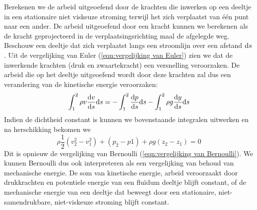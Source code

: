 Berekenen we de arbeid uitgeoefend door de krachten die inwerken op een deeltje in een stationaire niet viskeuze stroming terwijl het zich verplaatst van één punt naar een ander. De arbeid uitgeoefend door een kracht kunnen we berekenen als de kracht geprojecteerd in de verplaatsingsrichting maal de afgelegde weg. Beschouw een deeltje dat zich verplaatst langs een stroomlijn over een afstand $\mathrm{d} s$. Uit de vergelijking van Euler (\ref{eqn:vergelijking van Euler}) zien we dat de inwerkende krachten (druk en zwaartekracht) een versnelling veroorzaken. De arbeid die op het deeltje uitgeoefend wordt door deze krachten zal dus een verandering van de kinetische energie veroorzaken:
\begin{equation}
	\int_1^2 \rho v \frac{\mathrm{d} v}{\mathrm{d} s} \mathrm{d} s = - \int_1^2 \frac{\mathrm{d} p}{\mathrm{d} s} \mathrm{d} s - \int_1^2 \rho g \frac{\mathrm{d} y}{\mathrm{d} s} \mathrm{d} s
\end{equation}
Indien de dichtheid constant is kunnen we bovenstaande integralen uitwerken en na herschikking bekomen we
\begin{equation}
	\rho \frac{1}{2} (v_2^2-v_1^2) + (p_2-p1) + \rho g (z_2-z_1) = 0
	\label{eqn:kinetische energie en arbeid}
\end{equation}
Dit is opnieuw de vergelijking van Bernoulli (\ref{eqn:vergelijking van Bernoulli}). We kunnen Bernoulli dus ook interpreteren als een vergelijking van behoud van mechanische energie. De som van kinetische energie, arbeid veroorzaakt door drukkrachten en potentiele energie van een fluïdum deeltje blijft constant, of de mechanische energie van een deeltje dat beweegt door een stationaire, niet-samendrukbare, niet-viskeuze stroming blijft constant.

